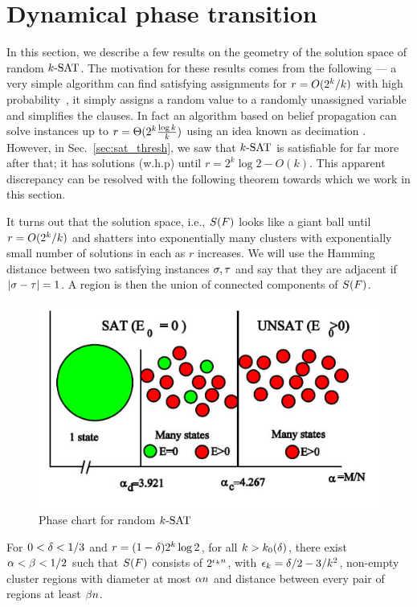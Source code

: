 \documentclass[letterpaper, 10pt, twocolumn, reqno]{amsart}
\begin{document}
\section{Dynamical phase transition}
\label{sec:dynamical_transition}

In this section, we describe a few results on the geometry of the solution space of random $\ksat$. The motivation for these results comes from the following --- a very simple algorithm can find satisfying assignments for $r = \bigo(2^k/k)$ with
high probability~\cite{chao1986probabilistic}, it simply assigns a random value to a randomly unassigned variable and simplifies the clauses. In fact an algorithm based on belief
propagation can solve instances up to $r = \bigth(2^k \f{\log k}{k})$ using an idea known as decimation \cite{montanari2007solving}. However, in Sec.~\ref{sec:sat_thresh}, we saw that $\ksat$ is satisfiable for far more after that; it has solutions (w.h.p) until $r = 2^k \log 2 - O(k)$. This apparent discrepancy can
be resolved with the following theorem towards which we work in this section.

It turns out that the solution space, i.e., $\sf$ looks like a giant ball
until $r = \bigo(2^k/k)$ and shatters into exponentially many clusters with
exponentially small number of solutions in each as $r$ increases. We will use the Hamming distance between two satisfying instances $\s,\t$ and say that they are adjacent if $\abs{\s-\t} = 1$. A region is then the union of connected components of $\sf$.

\begin{figure}[H]
\centering
\includegraphics[width=.7\columnwidth]{phase_chart}
\caption{Phase chart for random $\ksat$}
\label{fig:phase_chart}
\end{figure}

\begin{theorem}
For $0 < \d < 1/3$ and $r = (1-\d) 2^k \log 2$, for all $k > k_0(\d)$, there exist $\a < \b < 1/2$ such that $\sf$ consists of $2^{\e_k n}$, with $\e_k = \d/2 - 3/k^2$, non-empty cluster regions with diameter at most $\a n$ and distance between every pair of regions at least $\b n$.
\label{thm:shatter}
\end{theorem}
\end{document}

